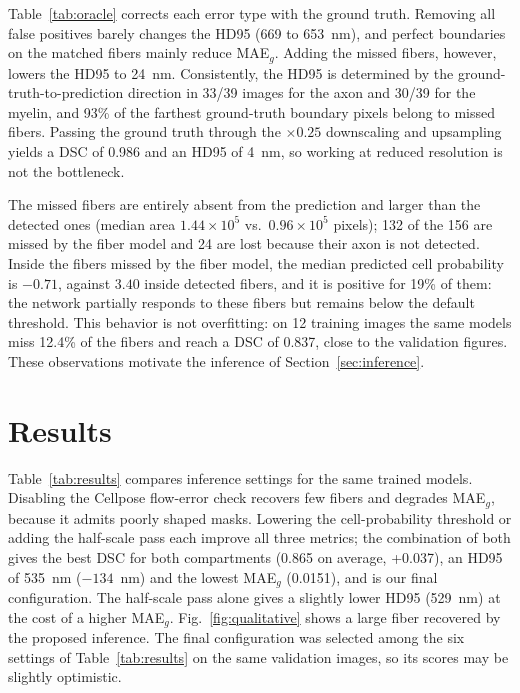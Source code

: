 \documentclass[conference]{IEEEtran}
\begin{document}
Table~\ref{tab:oracle} corrects each error type with the ground truth. Removing
all false positives barely changes the HD95 (669 to 653~nm), and perfect
boundaries on the matched fibers mainly reduce MAE$_g$. Adding the missed fibers,
however, lowers the HD95 to 24~nm. Consistently, the HD95 is determined by the
ground-truth-to-prediction direction in 33/39 images for the axon and 30/39 for
the myelin, and 93\% of the farthest ground-truth boundary pixels belong to
missed fibers. Passing the ground truth through the $\times0.25$ downscaling and
upsampling yields a DSC of 0.986 and an HD95 of 4~nm, so working at reduced
resolution is not the bottleneck.

The missed fibers are entirely absent from the prediction and larger than the
detected ones (median area $1.44\times10^5$ vs.\ $0.96\times10^5$ pixels); 132
of the 156 are missed by the fiber model and 24 are lost because their axon is
not detected. Inside the fibers missed by the fiber model, the median predicted
cell probability is $-0.71$, against $3.40$ inside detected fibers, and it is
positive for 19\% of them: the network partially responds to these fibers but
remains below the default threshold. This behavior is not overfitting: on 12
training images the same models miss 12.4\% of the fibers and reach a DSC of
0.837, close to the validation figures. These observations motivate the
inference of Section~\ref{sec:inference}.

\section{Results}

Table~\ref{tab:results} compares inference settings for the same trained
models. Disabling the Cellpose flow-error check recovers few fibers and degrades
MAE$_g$, because it admits poorly shaped masks. Lowering the cell-probability
threshold or adding the half-scale pass each improve all three metrics; the
combination of both gives the best DSC for both compartments (0.865 on average,
+0.037), an HD95 of 535~nm ($-134$~nm) and the lowest MAE$_g$ (0.0151), and is
our final configuration. The half-scale pass alone gives a slightly lower HD95
(529~nm) at the cost of a higher MAE$_g$. Fig.~\ref{fig:qualitative} shows a
large fiber recovered by the proposed inference. The final configuration was
selected among the six settings of Table~\ref{tab:results} on the same
validation images, so its scores may be slightly optimistic.
\end{document}

